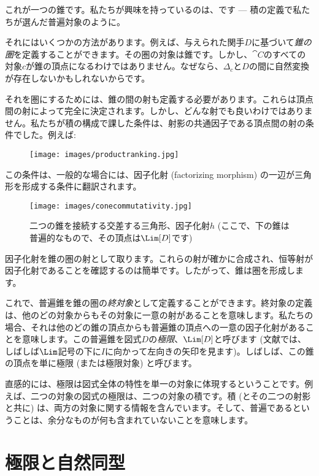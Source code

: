\noindent
これが一つの錐です。私たちが興味を持っているのは、です --- 積の定義で私たちが選んだ普遍対象のように。

それにはいくつかの方法があります。例えば、与えられた関手$D$に基づいて\emph{錐の圏}を定義することができます。その圏の対象は錐です。しかし、$\cat{C}$のすべての対象$c$が錐の頂点になるわけではありません。なぜなら、$\Delta_c$と$D$の間に自然変換が存在しないかもしれないからです。

それを圏にするためには、錐の間の射も定義する必要があります。これらは頂点間の射によって完全に決定されます。しかし、どんな射でも良いわけではありません。私たちが積の構成で課した条件は、射影の共通因子である頂点間の射の条件でした。例えば: 


\begin{figure}[H]
  \centering
  \texttt{[image: images/productranking.jpg]}
\end{figure}

この条件は、一般的な場合には、因子化射 (factorizing morphism) の一辺が三角形を形成する条件に翻訳されます。

\begin{figure}[H]
  \centering
  \texttt{[image: images/conecommutativity.jpg]}
  \caption{二つの錐を接続する交差する三角形、因子化射$h$ (ここで、下の錐は普遍的なもので、その頂点は$\Lim[D]$です) }
\end{figure}

\noindent
因子化射を錐の圏の射として取ります。これらの射が確かに合成され、恒等射が因子化射であることを確認するのは簡単です。したがって、錐は圏を形成します。

これで、普遍錐を錐の圏の\emph{終対象}として定義することができます。終対象の定義は、他のどの対象からもその対象に一意の射があることを意味します。私たちの場合、それは他のどの錐の頂点からも普遍錐の頂点への一意の因子化射があることを意味します。この普遍錐を図式$D$の\emph{極限}、$\Lim[D]$と呼びます (文献では、しばしば$\Lim$記号の下に$I$に向かって左向きの矢印を見ます)。しばしば、この錐の頂点を単に極限 (または極限対象) と呼びます。

直感的には、極限は図式全体の特性を単一の対象に体現するということです。例えば、二つの対象の図式の極限は、二つの対象の積です。積 (とその二つの射影と共に) は、両方の対象に関する情報を含んでいます。そして、普遍であるということは、余分なものが何も含まれていないことを意味します。

\section{極限と自然同型}

